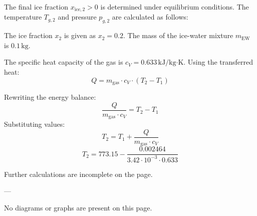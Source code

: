 The final ice fraction \( x_{\text{ice},2} > 0 \) is determined under equilibrium conditions. The temperature \( T_{g,2} \) and pressure \( p_{g,2} \) are calculated as follows:  

The ice fraction \( x_2 \) is given as \( x_2 = 0.2 \). The mass of the ice-water mixture \( m_{\text{EW}} \) is \( 0.1 \, \text{kg} \).  

The specific heat capacity of the gas is \( c_V = 0.633 \, \text{kJ/kg·K} \). Using the transferred heat:  
\[
Q = m_{\text{gas}} \cdot c_V \cdot (T_2 - T_1)
\]  

Rewriting the energy balance:  
\[
\frac{Q}{m_{\text{gas}} \cdot c_V} = T_2 - T_1
\]  
Substituting values:  
\[
T_2 = T_1 + \frac{Q}{m_{\text{gas}} \cdot c_V}
\]  
\[
T_2 = 773.15 - \frac{0.002464}{3.42 \cdot 10^{-3} \cdot 0.633}
\]  

Further calculations are incomplete on the page.  

---

No diagrams or graphs are present on this page.